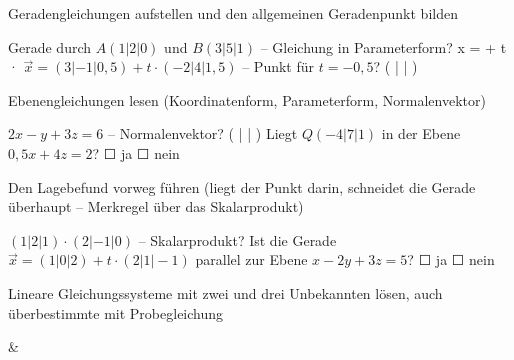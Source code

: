 \setcounter{aufgabe}{0}

\begin{aufgabe}{Geradengleichungen aufstellen und den allgemeinen Geradenpunkt bilden}
\begin{teile}
\teil Gerade durch $A(1|2|0)$ und $B(3|5|1)$ – Gleichung in Parameterform? x = \leerfeld + t · \leerfeld
\teil $\vec{x} = (3|-1|0{,}5) + t \cdot (-2|4|1{,}5)$ – Punkt für $t = -0{,}5$? ( \leerfeld | \leerfeld | \leerfeld )
\end{teile}
\end{aufgabe}

\begin{aufgabe}{Ebenengleichungen lesen (Koordinatenform, Parameterform, Normalenvektor)}
\begin{teile}
\teil $2x - y + 3z = 6$ – Normalenvektor? ( \leerfeld | \leerfeld | \leerfeld )
\teil Liegt $Q(-4|7|1)$ in der Ebene $0{,}5x + 4z = 2$? ☐ ja ☐ nein
\end{teile}
\end{aufgabe}

\begin{aufgabe}{Den Lagebefund vorweg führen (liegt der Punkt darin, schneidet die Gerade überhaupt – Merkregel über das Skalarprodukt)}
\begin{teile}
\teil $(1|2|1) \cdot (2|-1|0)$ – Skalarprodukt? \leerfeld
\teil Ist die Gerade $\vec{x} = (1|0|2) + t \cdot (2|1|-1)$ parallel zur Ebene $x - 2y + 3z = 5$? ☐ ja ☐ nein
\end{teile}
\end{aufgabe}

\begin{aufgabe}{Lineare Gleichungssysteme mit zwei und drei Unbekannten lösen, auch überbestimmte mit Probegleichung}
\begin{gleichungsraster}[2]
 &
 \\
\end{gleichungsraster}
\end{aufgabe}

